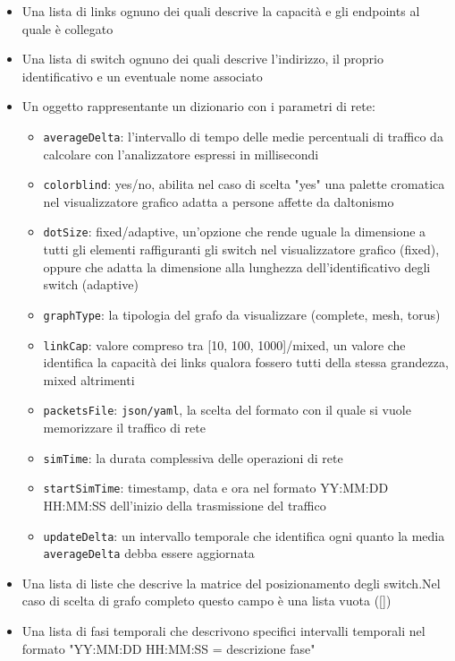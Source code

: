\documentclass[binding=0.6cm]{sapthesis}
\begin{document}
\begin{itemize}
    \item Una lista di links ognuno dei quali descrive la capacità e gli endpoints al quale è collegato
    \item Una lista di switch ognuno dei quali descrive l'indirizzo, il proprio identificativo e un eventuale nome associato
    \item Un oggetto rappresentante un dizionario con i parametri di rete:
    \begin{itemize}
        \item \texttt{averageDelta}: l'intervallo di tempo delle medie percentuali di traffico da calcolare con l'analizzatore espressi in millisecondi
        \item \texttt{colorblind}: yes/no, abilita nel caso di scelta "yes" una palette cromatica nel visualizzatore grafico adatta a persone affette da daltonismo
        \item \texttt{dotSize}: fixed/adaptive, un'opzione che rende uguale la dimensione a tutti gli elementi raffiguranti gli switch nel visualizzatore grafico (fixed), oppure che adatta la dimensione alla lunghezza dell'identificativo degli switch (adaptive)
        \item \texttt{graphType}: la tipologia del grafo da visualizzare (complete, mesh, torus)
        \item \texttt{linkCap}: valore compreso tra [10, 100, 1000]/mixed, un valore che identifica la capacità dei links qualora fossero tutti della stessa grandezza, mixed altrimenti
        \item \texttt{packetsFile}: \texttt{json}\texttt{/yaml}, la scelta del formato con il quale si vuole memorizzare il traffico di rete
        \item \texttt{simTime}: la durata complessiva delle operazioni di rete
        \item \texttt{startSimTime}: timestamp, data e ora nel formato YY:MM:DD HH:MM:SS dell'inizio della trasmissione del traffico
        \item \texttt{updateDelta}: un intervallo temporale che identifica ogni quanto la media \texttt{averageDelta} debba essere aggiornata
    \end{itemize}
    \item Una lista di liste che descrive la matrice del posizionamento degli switch.Nel caso di scelta di grafo completo questo campo è una lista vuota ([])
    \item Una lista di fasi temporali che descrivono specifici intervalli temporali nel formato "YY:MM:DD HH:MM:SS = descrizione fase"
\end{itemize}
\end{document}
